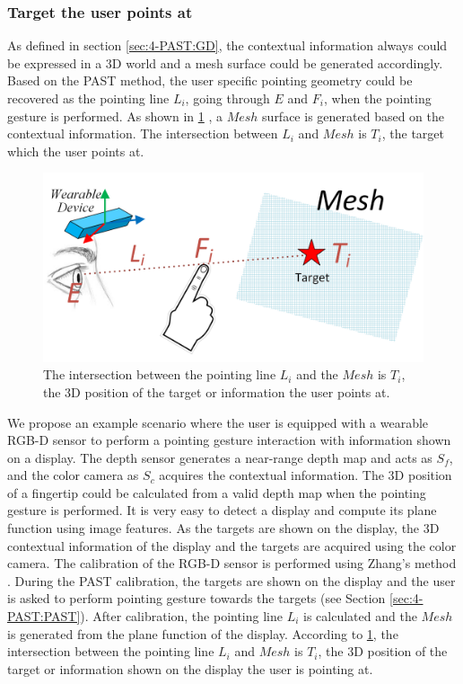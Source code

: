 \subsubsection{Target the user points at} \label{sec:4-PAST:findTarget}
As defined in section \ref{sec:4-PAST:GD}, the contextual information always could be expressed in a 3D world and a mesh surface could be generated accordingly. 
Based on the PAST method, the user specific pointing geometry could be recovered as the pointing line $L_{i}$, going through $E$ and  $F_i$, when the pointing gesture is performed.
As shown in \figurename{ \ref{fig:4-PAST:pointToTarget}} , a $Mesh$ surface is generated based on the contextual information. The intersection between $L_{i}$ and $Mesh$ is $T_i$, the target which the user points at. 
\begin{figure} [htb]
	\centering
	\includegraphics[width= \linewidth]{figures/4-PAST/pointToTarget.png}
	\caption{ The intersection between the pointing line $L_{i}$ and the $Mesh$ is  $T_i$, the 3D position of the target or information the user points at.}
	\label{fig:4-PAST:pointToTarget}
\end{figure}

We propose an example scenario where the user is equipped with a wearable RGB-D sensor to perform a pointing gesture interaction with information shown on a display.
The depth sensor generates a near-range depth map and acts as $S_f$, and the color camera as $S_c$ acquires the contextual information. The 3D position of a fingertip could be calculated from a valid depth map when the pointing gesture is performed. It is very easy to detect a display and compute its plane function using image features. As the targets are shown on the display, the 3D contextual information of the display and the targets are acquired using the color camera. The calibration of the RGB-D sensor is performed using Zhang{\rq}s method \cite{Zhang2000}. During the PAST calibration, the targets are shown on the display and the user is asked to perform pointing gesture towards the targets (see Section \ref{sec:4-PAST:PAST}). After calibration, the pointing line $L_i$ is calculated and the  $Mesh$ is generated from the plane function of the display. According to \figurename{ \ref{fig:4-PAST:pointToTarget}}, the intersection between the pointing line $L_{i}$ and $Mesh$ is  $T_i$, the 3D position of the target or information shown on the display the user is pointing at.

